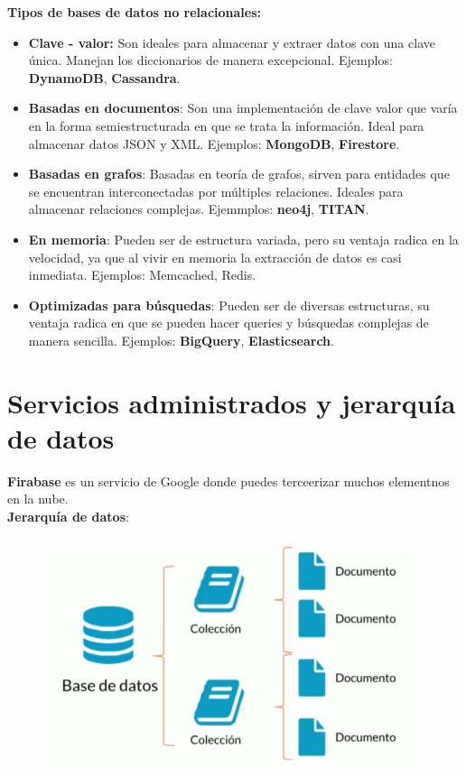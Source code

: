 \documentclass{article}
\begin{document}
\textbf{Tipos de bases de datos no relacionales:}\\

\begin{itemize}
  \item \textbf{Clave - valor:} Son ideales para almacenar y extraer datos con
    una clave única. Manejan los diccionarios de manera excepcional. Ejemplos:
    \textbf{DynamoDB}, \textbf{Cassandra}.
  \item \textbf{Basadas en documentos}: Son una implementación de clave valor
    que varía en la forma semiestructurada en que se trata la información.
    Ideal para almacenar datos JSON y XML. Ejemplos: \textbf{MongoDB},
    \textbf{Firestore}.
  \item \textbf{Basadas en grafos}: Basadas en teoría de grafos, sirven para
    entidades que se encuentran interconectadas por múltiples relaciones.
    Ideales para almacenar relaciones complejas. Ejemmplos: \textbf{neo4j},
    \textbf{TITAN}.
  \item \textbf{En memoria}: Pueden ser de estructura variada, pero su ventaja
    radica en la velocidad, ya que al vivir en memoria la extracción de datos
    es casi inmediata. Ejemplos: Memcached, Redis.
  \item \textbf{Optimizadas para búsquedas}: Pueden ser de diversas
    estructuras, su ventaja radica en que se pueden hacer queries y búsquedas
    complejas de manera sencilla. Ejemplos: \textbf{BigQuery},
    \textbf{Elasticsearch}.
\end{itemize}

\section{Servicios administrados y jerarquía de datos}%
\textbf{Firabase} es un servicio de Google donde puedes terceerizar muchos
elementnos en la nube.\\

\textbf{Jerarquía de datos}:

\begin{figure}[h!]
  \centering
  \includegraphics[scale=0.75]{./Pictures/165_jerarquia_BD_documentos.png}
\end{figure}
\end{document}
